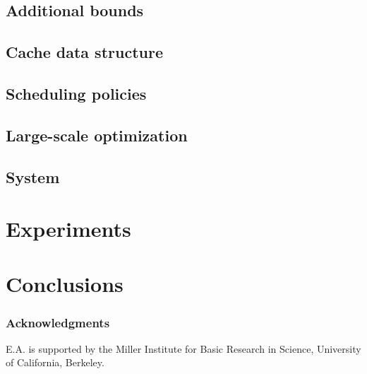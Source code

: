 \subsection{Additional bounds}

\subsection{Cache data structure}
\label{sec:cache}

\subsection{Scheduling policies}

\subsection{Large-scale optimization}

\subsection{System}

\section{Experiments}

\section{Conclusions}

\subsubsection*{Acknowledgments}

E.A. is supported by the Miller Institute for Basic Research in Science, University of California, Berkeley.




